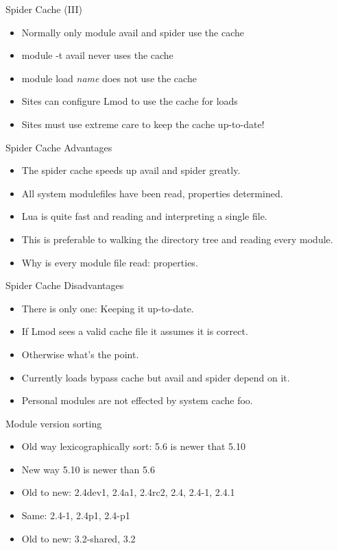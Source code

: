 \documentclass[dvipsnames,aspectratio=169]{beamer}
\begin{document}
\begin{frame}{Spider Cache (III)}
  \begin{itemize}
    \item Normally only module avail and spider use the cache
    \item module -t avail never uses the cache
    \item module load \emph{name} does not use the cache
    \item Sites can configure Lmod to use the cache for loads
    \item Sites must use extreme care to keep the cache up-to-date!
  \end{itemize}
\end{frame}

\begin{frame}{Spider Cache Advantages}
  \begin{itemize}
    \item The spider cache speeds up avail and spider greatly.
    \item All system modulefiles have been read, properties determined.
    \item Lua is quite fast and reading and interpreting a single file.
    \item This is preferable to walking the directory tree and reading
      every module.
    \item Why is every module file read: properties.
  \end{itemize}
\end{frame}

\begin{frame}{Spider Cache Disadvantages}
  \begin{itemize}
    \item There is only one: Keeping it up-to-date.
    \item If Lmod sees a valid cache file it assumes it is correct.
    \item Otherwise what's the point.
    \item Currently loads bypass cache but avail and spider depend on it.
    \item Personal modules are not effected by system cache foo.
  \end{itemize}
\end{frame}

\begin{frame}{Module version sorting}
  \begin{itemize}
    \item Old way lexicographically sort: 5.6 is newer that 5.10
    \item New way 5.10 is newer than 5.6
    \item Old to new: 2.4dev1, 2.4a1, 2.4rc2, 2.4, 2.4-1, 2.4.1
    \item Same: 2.4-1, 2.4p1, 2.4-p1
    \item Old to new: 3.2-shared, 3.2
  \end{itemize}
\end{frame}
\end{document}
